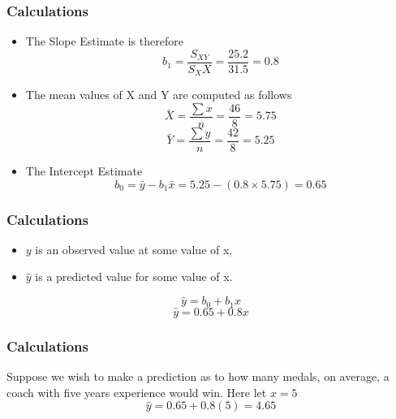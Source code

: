 \documentclass[a4]{beamer}
\begin{document}
\begin{frame}
\frametitle{Calculations}
\begin{itemize}
\item The Slope Estimate is therefore
\[ b_1 = \frac{S_{XY}}{S_XX} = \frac{25.2}{31.5} =  0.8 \]
\item The mean values of X and Y are computed as follows
\[ \bar{X}  = \frac{\sum x}{n} = \frac{46}{8} = 5.75 \]
\[ \bar{Y}  = \frac{\sum y}{n} = \frac{42}{8} = 5.25 \]
\item The Intercept Estimate 
\[ b_0 = \bar{y} - b_1 \bar{x} = 5.25 - (0.8\times 5.75) =0.65 \] 
\end{itemize}
\end{frame}

\begin{frame}
\frametitle{Calculations}
\begin{itemize}
\item $y$ is an observed value at some value of x,
\item $\hat{y}$ is a predicted value for some value of x.
\end{itemize}

\[ \hat{y} = b_0 + b_1x \]
\[ \hat{y} = 0.65 + 0.8x \]
\end{frame}

\begin{frame}
\frametitle{Calculations}
Suppose we wish to make a prediction as to how many medals, on average, a coach with five years experience would win. 
Here let $x=5$
\[ \hat{y} = 0.65 + 0.8(5) = 4.65\]
\end{frame}
\end{document}

